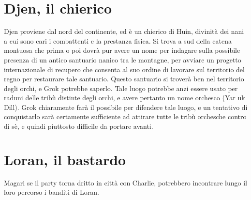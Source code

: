 \documentclass[10pt,twoside, twocolumn, openany]{dndbook}
\begin{document}
\section{Djen, il chierico}
Djen proviene dal nord del continente, ed è un chierico di Huin, divinità dei nani a cui sono cari i combattenti e la prestanza fisica.
Si trova a sud della catena montuosa che prima o poi dovrà pur avere un nome per indagare sulla possibile presenza di un antico santuario nanico tra le montagne, per avviare un progetto internazionale di recupero che consenta al suo ordine di lavorare sul territorio del regno per restaurare tale santuario.
Questo santuario si troverà ben nel territorio degli orchi, e Grok potrebbe saperlo. Tale luogo potrebbe anzi essere usato per raduni delle tribù distinte degli orchi, e avere pertanto un nome orchesco (Yar uk Dill).
Grok chiaramente farà il possibile per difendere tale luogo, e un tentativo di conquistarlo sarà certamente sufficiente ad attirare tutte le tribù orchesche contro di sè, e quindi piuttosto difficile da portare avanti.

\section{Loran, il bastardo}
Magari se il party torna dritto in città con Charlie, potrebbero incontrare lungo il loro percorso i banditi di Loran. 
\end{document}
